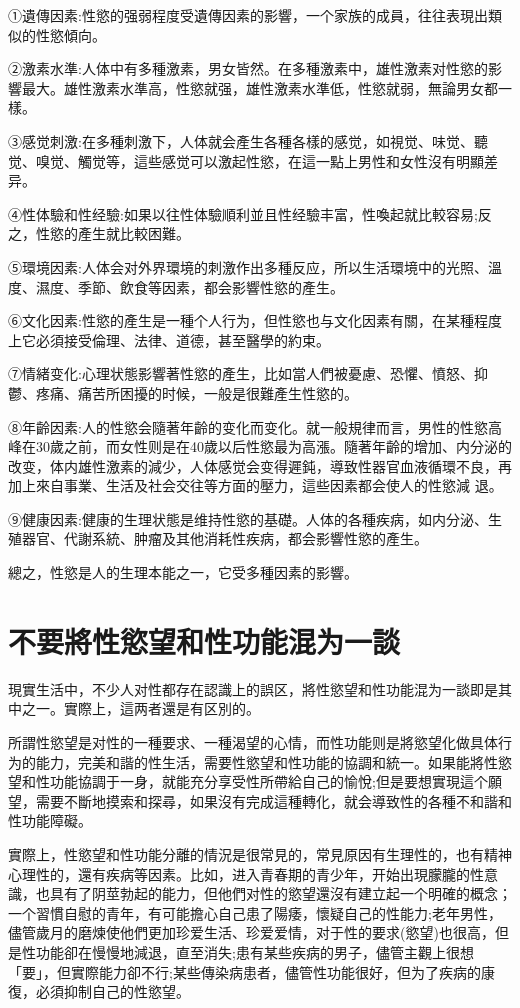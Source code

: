 \documentclass[12pt,UTF8]{ctexbook}
\begin{document}
①遺傳因素:性慾的强弱程度受遺傳因素的影響，一个家族的成員，往往表現出類似的性慾傾向。

②激素水準:人体中有多種激素，男女皆然。在多種激素中，雄性激素对性慾的影響最大。雄性激素水準高，性慾就强，雄性激素水準低，性慾就弱，無論男女都一樣。

③感觉刺激:在多種刺激下，人体就会產生各種各樣的感觉，如視觉、味觉、聽觉、嗅觉、觸觉等，這些感觉可以激起性慾，在這一點上男性和女性沒有明顯差异。

④性体驗和性经驗:如果以往性体驗順利並且性经驗丰富，性喚起就比較容易;反之，性慾的產生就比較困難。

⑤環境因素:人体会对外界環境的刺激作出多種反应，所以生活環境中的光照、溫度、濕度、季節、飲食等因素，都会影響性慾的產生。

⑥文化因素:性慾的產生是一種个人行为，但性慾也与文化因素有關，在某種程度上它必須接受倫理、法律、道德，甚至醫學的約束。

⑦情緒变化:心理状態影響著性慾的產生，比如當人們被憂慮、恐懼、憤怒、抑鬱、疼痛、痛苦所困擾的时候，一般是很難產生性慾的。

⑧年齡因素:人的性慾会隨著年齡的变化而变化。就一般規律而言，男性的性慾高峰在30歲之前，而女性则是在40歲以后性慾最为高漲。隨著年齡的增加、内分泌的改变，体内雄性激素的減少，人体感觉会变得遲鈍，導致性器官血液循環不良，再加上來自事業、生活及社会交往等方面的壓力，這些因素都会使人的性慾減
退。

⑨健康因素:健康的生理状態是维持性慾的基礎。人体的各種疾病，如内分泌、生殖器官、代謝系統、肿瘤及其他消耗性疾病，都会影響性慾的產生。

總之，性慾是人的生理本能之一，它受多種因素的影響。

\section{不要將性慾望和性功能混为一談}

現實生活中，不少人对性都存在認識上的誤区，將性慾望和性功能混为一談即是其中之一。實際上，這两者還是有区別的。

所謂性慾望是对性的一種要求、一種渴望的心情，而性功能则是將慾望化做具体行为的能力，完美和諧的性生活，需要性慾望和性功能的協調和統一。如果能將性慾望和性功能協調于一身，就能充分享受性所帶給自己的愉悅;但是要想實現這个願望，需要不斷地摸索和探尋，如果沒有完成這種轉化，就会導致性的各種不和諧和性功能障礙。

實際上，性慾望和性功能分離的情況是很常見的，常見原因有生理性的，也有精神心理性的，還有疾病等因素。比如，进入青春期的青少年，开始出現朦朧的性意識，也具有了阴莖勃起的能力，但他們对性的慾望還沒有建立起一个明確的概念；一个習慣自慰的青年，有可能擔心自己患了陽痿，懷疑自己的性能力;老年男性，儘管歲月的磨煉使他們更加珍爱生活、珍爱爱情，对于性的要求(慾望)也很高，但是性功能卻在慢慢地減退，直至消失;患有某些疾病的男子，儘管主觀上很想「要」，但實際能力卻不行;某些傳染病患者，儘管性功能很好，但为了疾病的康復，必須抑制自己的性慾望。
\end{document}
